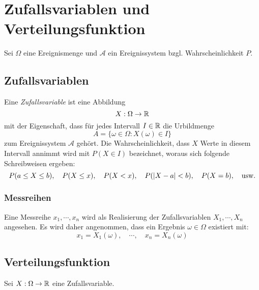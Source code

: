 
	\section{Zufallsvariablen und Verteilungsfunktion}
		Sei \( \Omega \) eine Ereignismenge und \( \mathcal{A} \) ein Ereignissystem bzgl. Wahrscheinlichkeit \(P\).

		\subsection{Zufallsvariablen} %
			Eine \textit{Zufallsvariable} ist eine Abbildung \[ X : \Omega \rightarrow \mathbb{R} \] mit der Eigenschaft, dass für jedes Intervall \( I \in \mathbb{R} \) die Urbildmenge \[ A = \{ \omega \in \Omega : X(\omega) \in I \} \] zum Ereignissystem \(\mathcal{A}\) gehört. Die Wahrscheinlichkeit, dass \(X\) Werte in diesem Intervall annimmt wird mit \( P(X \in I) \) bezeichnet, woraus sich folgende Schreibweisen ergeben:
			\begin{equation*}
				P(a \leq X \leq b), \quad P(X \leq x), \quad P(X < x), \quad P(\abs{X - a} < b), \quad P(X = b), \quad \textrm{usw.}
			\end{equation*}

			\subsubsection{Messreihen}
				Eine Messreihe \( x_1, \cdots, x_n \) wird als Realisierung der Zufallsvariablen \( X_1, \cdots, X_n \) angesehen. Es wird daher angenommen, dass ein Ergebnis \( \omega \in \Omega \) existiert mit:
				\begin{equation*}
					x_1 = X_1(\omega), \quad \cdots, \quad x_n = X_n(\omega)
				\end{equation*}

		\subsection{Verteilungsfunktion}
			Sei \( X : \Omega \rightarrow \mathbb{R} \) eine Zufallsvariable.

